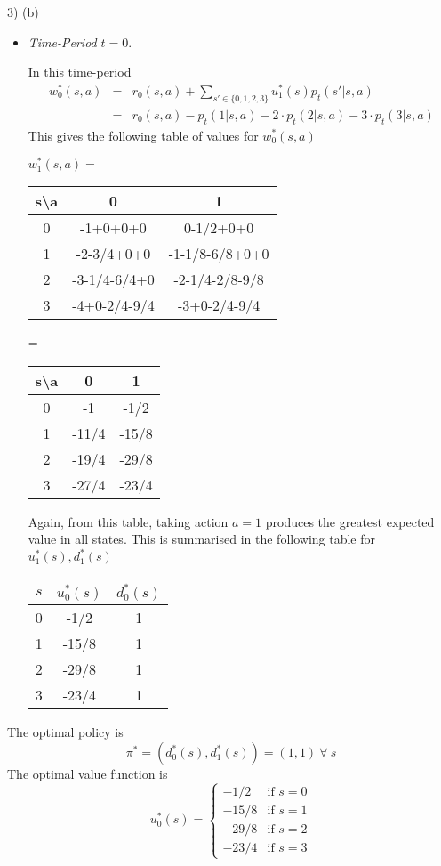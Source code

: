 \documentclass[11pt,a4paper]{article}
\begin{document}
\begin{answer}{3) (b)}
\begin{itemize}
    \item \textit{Time-Period} $t=0$.
    \par In this time-period
    \[\begin{array}{rcl}
      w_0^*(s,a)&=&r_0(s,a)+\sum_{s'\in\{0,1,2,3\}}u_1^*(s)p_t(s'|s,a)\\
      &=&r_0(s,a)-p_t(1|s,a)-2\cdot p_t(2|s,a)-3\cdot p_t(3|s,a)
    \end{array}\]
    This gives the following table of values for $w_0^*(s,a)$
    \begin{center}
      $w_1^*(s,a)=$
      \begin{tabular}{c|cc}
        s\textbackslash a&0&1\\\hline
        0&-1+0+0+0&0-1/2+0+0\\
        1&-2-3/4+0+0&-1-1/8-6/8+0+0\\
        2&-3-1/4-6/4+0&-2-1/4-2/8-9/8\\
        3&-4+0-2/4-9/4&-3+0-2/4-9/4&
      \end{tabular}
      =
      \begin{tabular}{c|cc}
        s\textbackslash a&0&1\\\hline
        0&-1&-1/2\\
        1&-11/4&-15/8\\
        2&-19/4&-29/8\\
        3&-27/4&-23/4
      \end{tabular}
    \end{center}
    Again, from this table, taking action $a=1$ produces the greatest expected value in all states. This is summarised in the following table for $u_1^*(s),d_1^*(s)$
    \begin{center}
      \begin{tabular}{c|c|c}
        $s$&$u_0^*(s)$&$d_0^*(s)$\\\hline
        0&-1/2&1\\
        1&-15/8&1\\
        2&-29/8&1\\
        3&-23/4&1
      \end{tabular}
    \end{center}
  \end{itemize}
  The optimal policy is
  \[ \pi^*=(d_0^*(s),d_1^*(s))=(1,1)\ \forall\ s \]
  The optimal value function is
  \[ u_0^*(s)=\begin{cases}
                -1/2&\text{if }s=0\\
                -15/8&\text{if }s=1\\
                -29/8&\text{if }s=2\\
                -23/4&\text{if }s=3
              \end{cases} \]
\end{answer}
\end{document}
